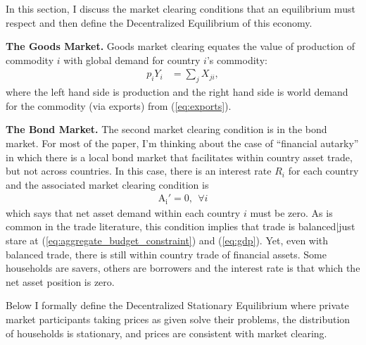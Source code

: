 \documentclass[12pt,pdftex]{article}
\begin{document}
\begin{onehalfspacing}
In this section, I discuss the market clearing conditions that an equilibrium must respect and then define the Decentralized Equilibrium of this economy.

\textbf{The Goods Market.} Goods market clearing equates the value of production of commodity $i$  with global demand for country $i$'s commodity:
\begin{align}
p_{i} Y_{i} &= \sum_{j}  X_{ji} \label{eq:goods-supply},
\end{align}
where the left hand side is production and the right hand side is world demand for the commodity (via exports) from (\ref{eq:exports}).

\textbf{The Bond Market.} The second market clearing condition is in the bond market. For most of the paper, I'm thinking about the case of ``financial autarky'' in which there is a local bond market that facilitates within country asset trade, but not across countries. In this case, there is an interest rate $R_i$ for each country and the associated market clearing condition is
\begin{align}
\mathrm{A_i'} = 0, \ \ \forall i
\label{eq:bond-market-country}
\end{align}
which says that net asset demand within each country $i$ must be zero. As is common in the trade literature, this condition implies that trade is balanced|just stare at (\ref{eq:aggregate_budget_constraint}) and (\ref{eq:gdp}). Yet, even with balanced trade, there is still within country trade of financial assets. Some households are savers, others are borrowers and the interest rate is that which the net asset position is zero.

Below I formally define the Decentralized Stationary Equilibrium where private market participants taking prices as given solve their problems, the distribution of households is stationary, and prices are consistent with market clearing.


\end{onehalfspacing}
\end{document}
